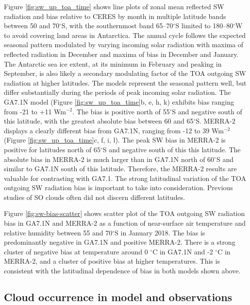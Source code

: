 Figure \ref{fig:sw_up_toa_time} shows line plots of zonal mean reflected SW
radiation and bias relative to CERES by month in multiple latitude bands
between 50 and 70$^\circ$S, with the southernmost band 65--70$^\circ$S limited
to 180--80$^\circ$W to avoid covering land areas in Antarctica. The annual
cycle follows the expected seasonal pattern modulated by varying incoming solar
radiation with maxima of reflected radiation in December and maxima of bias in
December and January. The Antarctic sea ice extent, at its minimum in February
and peaking in September, is also likely a secondary modulating factor of the
TOA outgoing SW radiation at higher latitudes. The models represent the
seasonal pattern well, but differ substantially during the periods of peak
incoming solar radiation. The GA7.1N model (Figure \ref{fig:sw_up_toa_time}b, e,
h, k) exhibits bias ranging from -21 to +11 Wm$^{-2}$. The bias is positive
north of 55$^\circ$S and negative south of this latitude, with the greatest
absolute bias between 60 and 65$^\circ$S. MERRA-2 displays a clearly different
bias from GA7.1N, ranging from -12 to 39 Wm$^{-2}$ (Figure
\ref{fig:sw_up_toa_time}c, f, i, l). The peak SW bias in MERRA-2 is positive for
latitudes north of 65$^\circ$S and negative south of this this latitude. The
absolute bias in MERRA-2 is much larger than in GA7.1N north of 60$^\circ$S and
similar to GA7.1N south of this latitude. Therefore, the MERRA-2 results are
valuable for contrasting with GA7.1. The strong latitudinal variation of the
TOA outgoing SW radiation bias is important to take into consideration.
Previous studies of SO clouds often did not discern different latitudes.

Figure \ref{fig:sw-bias-scatter} shows scatter plot of the TOA outgoing SW
radiation bias in GA7.1N and MERRA-2 as a function of near-surface air
temperature and relative humidity between 55 and 70$^\circ$S in January
2018. The bias is predominantly negative in GA7.1N and positive MERRA-2. There
is a strong cluster of negative bias at temperature around 0 $^\circ$C in
GA7.1N and -2 $^\circ$C in MERRA-2, and a cluster of positive bias at higher
temperatures. This is consistent with the latitudinal dependence of bias in
both models shown above.

\subsection{Cloud occurrence in model and observations}
\label{sec:cloud-occurrence}


